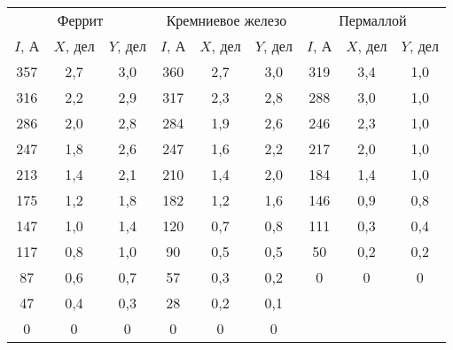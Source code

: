 \begin{table}
\begin{tabular}{ccc|ccc|ccc}
\toprule
\multicolumn{3}{c}{Феррит} & \multicolumn{3}{c}{Кремниевое железо} & \multicolumn{3}{c}{Пермаллой} \\
$I$, А & $X$, дел & $Y$, дел & $I$, А & $X$, дел & $Y$, дел & $I$, А & $X$, дел & $Y$, дел \\
\midrule
357 & 2,7	& 3,0 & 360	& 2,7 & 3,0 & 319 & 3,4	& 1,0   \\
316 & 2,2   & 2,9 & 317 & 2,3 & 2,8 & 288 & 3,0 & 1,0   \\
286 & 2,0   & 2,8 & 284 & 1,9 & 2,6 & 246 & 2,3	& 1,0   \\
247 & 1,8   & 2,6 & 247 & 1,6 & 2,2 & 217 & 2,0 & 1,0   \\
213 & 1,4   & 2,1 & 210 & 1,4 & 2,0 & 184 & 1,4 & 1,0   \\
175 & 1,2   & 1,8 & 182 & 1,2 & 1,6 & 146 & 0,9 & 0,8   \\
147 & 1,0	& 1,4 & 120 & 0,7 &	0,8	& 111 & 0,3	& 0,4   \\
117 & 0,8	& 1,0 & 90  & 0,5 &	0,5	& 50  & 0,2	& 0,2   \\
87  & 0,6	& 0,7 & 57  & 0,3 &	0,2	& 0   & 0   & 0     \\
47  & 0,4	& 0,3 & 28  & 0,2 &	0,1	               		\\
0   & 0     & 0   & 0   & 0   & 0                  		\\	
\bottomrule
\end{tabular}
\end{table}